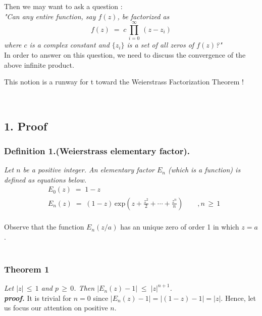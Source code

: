Then we may want to ask a question :\\
\textit{"Can any entire function, say $f(z)$, be factorized as $$ f(z) \;=\; c\,\prod_{i=0}^{\infty} \, (z-z_i) $$ where $c$ is a complex constant and $\{z_i\}$ is a set of all zeros of $f(z)$?"}\\
 
In order to answer on this question, we need to discuss the convergence of the above infinite product.\\

\begin{center} 
This notion is a runway for t toward the Weierstrass Factorization Theorem ! 
\end{center}
{\quad}\\





\subsection*{1. Proof}
\vspace{2mm}

\subsubsection*{Definition 1.(Weierstrass elementary factor). \\[-0.6cm]}
\textit{Let $n$ be a positive integer. An elementary factor $E_n$ (which is a function) is defined as equations below.}
\begin{align*} 
&E_0 (z) \;=\; 1-z \\ 
&E_n (z) \;=\; (1-z) \, \mathrm{exp}\left(z + \frac{z^2}{2} + \cdots + \frac{z^n}{n} \right) \qquad , n \,\ge\, 1 
\end{align*}\\

Observe that the function $E_n (z/a)$ has an unique zero of order 1 in which $z=a$.\\ \\


\subsubsection*{Theorem 1 \\[-0.6cm]}
\textit{Let $|z| \, \le \, 1$ and $p \,\ge\, 0$. Then $ | E_n (z) - 1 | \; \le \; |z|^{n+1} $.}\\

\textbf{\textit{proof.}}   
It is trivial for $n=0$ since $ | E_n(z) - 1 | = | (1-z)-1 | = |z| $. Hence, let us focus our attention on positive $n$.

